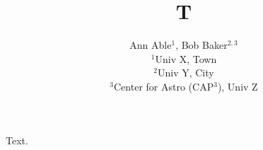 \documentclass{article}
\begin{document}
\title{T}
\author{\parbox{10cm}{\centering Ann Able$^{1}$, Bob Baker$^{2,3}$ \\ $^1$Univ X, Town \\ $^2$Univ Y, City \\ $^3$Center for Astro (CAP$^3$), Univ Z}}
\maketitle
Text.
\end{document}
